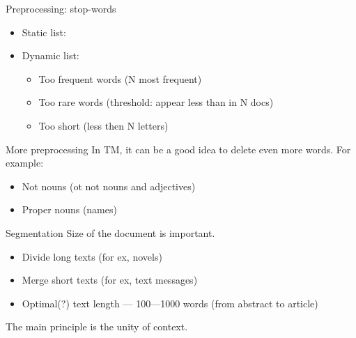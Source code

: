 \documentclass[svgnames]{beamer}
\begin{document}
    \begin{frame}{Preprocessing: stop-words}
        \begin{itemize}
            \item Static list:
            \item Dynamic list:

            \begin{itemize}
                \item Too frequent words (N most frequent)
                \item Too rare words (threshold: appear less than in N docs)
                \item Too short (less then N letters)
            \end{itemize}
        \end{itemize}
    \end{frame}

    \begin{frame}{More preprocessing}
        In TM, it can be a good idea to delete even more words. For example:
        \begin{itemize}
            \item Not nouns (ot not nouns and adjectives)
            \item Proper nouns (names)
        \end{itemize}
    \end{frame}

    \begin{frame}{Segmentation}
        Size of the document is important.
        \begin{itemize}
            \item Divide long texts (for ex, novels)
            \item Merge short texts (for ex, text messages)
            \item Optimal(?) text length — 100—1000 words (from abstract to article)
        \end{itemize}
        \centering
        \alert{The main principle is the unity of context.}
    \end{frame}


\end{document}
